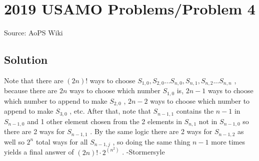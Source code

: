 \documentclass[12pt]{article}
\begin{document}
\section*{{2019 USAMO Problems/Problem 4}}
Source: AoPS Wiki

\subsection*{Solution}
Note that there are $(2n)!$ ways to choose $S_{1, 0}, S_{2, 0}... S_{n, 0}, S_{n, 1}, S_{n, 2}... S_{n, n}$ , because there are $2n$ ways to choose which number $S_{1, 0}$ is, $2n-1$ ways to choose which number to append to make $S_{2, 0}$ , $2n-2$ ways to choose which number to append to make $S_{3, 0}$ , etc. After that, note that $S_{n-1, 1}$ contains the $n-1$ in $S_{n-1, 0}$ and 1 other element chosen from the 2 elements in $S_{n, 1}$ not in $S_{n-1, 0}$ so there are 2 ways for $S_{n-1, 1}$ . By the same logic there are 2 ways for $S_{n-1, 2}$ as well so $2^n$ total ways for all $S_{n-1, j}$ , so doing the same thing $n-1$ more times yields a final answer of $(2n)!\cdot 2^{\left(n^2\right)}$ . -Stormersyle
\end{document}
